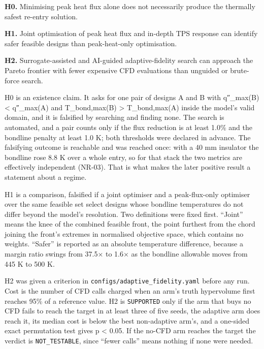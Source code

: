 \documentclass[
  a4paper,
  11pt]{article}
\renewenvironment{quote}
  {\begin{tcolorbox}[enhanced, breakable, colback=white, colframe=white,
     borderline west={1.5pt}{0pt}{ruleline}, arc=0pt, boxrule=0pt, boxsep=0pt,
     left=10pt, right=0pt, top=3pt, bottom=3pt, before skip=6pt, after skip=8pt]}
  {\end{tcolorbox}}
\begin{document}
\begin{quote}
\textbf{H0.} Minimising peak heat flux alone does not necessarily
produce the thermally safest re-entry solution.

\textbf{H1.} Joint optimisation of peak heat flux and in-depth TPS
response can identify safer feasible designs than peak-heat-only
optimisation.

\textbf{H2.} Surrogate-assisted and AI-guided adaptive-fidelity search
can approach the Pareto frontier with fewer expensive CFD evaluations
than unguided or brute-force search.
\end{quote}

H0 is an existence claim. It asks for one pair of designs A and B with
q{\symfont ″}\_max(B) \textless{} q{\symfont ″}\_max(A) and
T\_bond,max(B) \textgreater{} T\_bond,max(A) inside the model's valid
domain, and it is falsified by searching and finding none. The search is
automated, and a pair counts only if the flux reduction is at least
1.0\% and the bondline penalty at least 1.0 K; both thresholds were
declared in advance. The falsifying outcome is reachable and was reached
once: with a 40 mm insulator the bondline rose 8.8 K over a whole entry,
so for that stack the two metrics are effectively independent (NR-03).
That is what makes the later positive result a statement about a regime.

H1 is a comparison, falsified if a joint optimiser and a peak-flux-only
optimiser over the same feasible set select designs whose bondline
temperatures do not differ beyond the model's resolution. Two
definitions were fixed first. ``Joint'' means the knee of the combined
feasible front, the point furthest from the chord joining the front's
extremes in normalised objective space, which contains no weights.
``Safer'' is reported as an absolute temperature difference, because a
margin ratio swings from 37.5× to 1.6× as the bondline allowable moves
from 445 K to 500 K.

H2 was given a criterion in
\texttt{configs/\allowbreak{}adaptive\_\allowbreak{}fidelity.yaml}
before any run. Cost is the number of CFD calls charged when an arm's
truth hypervolume first reaches 95\% of a reference value. H2 is
\texttt{SUPPORTED} only if the arm that buys no CFD fails to reach the
target in at least three of five seeds, the adaptive arm does reach it,
its median cost is below the best non-adaptive arm's, and a one-sided
exact permutation test gives p \textless{} 0.05. If the no-CFD arm
reaches the target the verdict is \texttt{NOT\_\allowbreak{}TESTABLE},
since ``fewer calls'' means nothing if none were needed.
\end{document}
